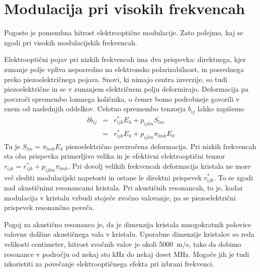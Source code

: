 \documentclass[11pt,fleqn]{book} %
\begin{document}
\section{Modulacija pri visokih frekvencah}

Pogosto je pomembna hitrost elektrooptične modulacije. Zato polejmo,
kaj se zgodi pri visokih modulacijskih frekvencah.

Elektrooptični pojav pri nizkih frekvencah ima dva prispevka: direktnega,
kjer zunanje polje vpliva neposredno na elektronsko polarizabilnost,
in posrednega preko piezoelektričnega pojava. Snovi, ki nimajo centra
inverzije, so tudi piezoelektrične in se v zunanjem električnem polju
deformirajo. Deformacija pa povzroči spremembo lomnega količnika,
o čemer bomo podrobneje govorili v enem od naslednjih oddelkov. Celotno
spremembo tenzorja $b_{ij}$ lahko zapišemo 
\begin{eqnarray}
\delta b_{ij} & = & r_{ijk}^{\ast}E_{k}+p_{ijlm}S_{lm}\nonumber \\
 & = & r_{ijk}^{\ast}E_{k}+p_{ijlm}\pi_{lmk}E_{k}
\end{eqnarray}
 Tu je $S_{lm}=\pi_{lmk}E_{k}$ piezoelektrično povzročena deformacija.
Pri nizkih frekvencah sta oba prispevka primerljivo velika in je efektivni
elektrooptični tenzor $r_{ijk}=r_{ijk}^{\ast}+p_{ijlm}\pi_{lmk}$.
Pri dovolj velikih frekvencah deformacija kristala ne more več slediti
modulacijski napetosti in ostane le direktni prispevek $r_{ijk}^{\ast}$.
To se zgodi nad akustičnimi resonancami kristala. Pri akustičnih resonancah,
to je, kadar modulacija v kristalu vzbudi stoječe zvočno valovanje,
pa se piezoelektrični prispevek resonančno poveča.

Pogoj za akustično resonanco je, da je dimenzija kristala mnogokratnik
polovice valovne dolžine akustičnega vala v kristalu. Uporabne dimenzije
kristalov so reda velikosti centimeter, hitrost zvočnih valov je okoli
5000~m/s, tako da dobimo resonance v področju od nekaj sto kHz do
nekaj deset MHz. Mogoče jih je tudi izkoristiti za povečanje elektrooptičnega
efekta pri izbrani frekvenci.
\end{document}
